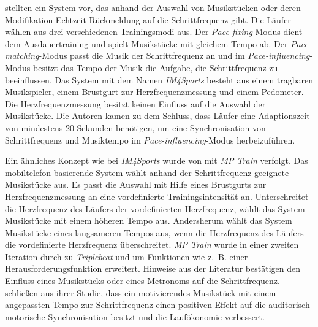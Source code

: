 \citet[][]{Wijnalda2005} stellten ein System vor, das anhand der Auswahl von Musikstücken oder deren Modifikation Echtzeit-Rückmeldung auf die Schrittfrequenz gibt. Die Läufer wählen aus drei verschiedenen Trainingsmodi aus. Der \emph{Pace-fixing}-Modus dient dem Ausdauertraining und spielt Musikstücke mit gleichem Tempo ab. Der \emph{Pace-matching}-Modus passt die Musik der Schrittfrequenz an und im \emph{Pace-influencing}-Modus besitzt das Tempo der Musik die Aufgabe, die Schrittfrequenz zu beeinflussen. Das System mit dem Namen \emph{IM4Sports} besteht aus einem tragbaren Musikspieler, einem Brustgurt zur Herzfrequenzmessung und einem Pedometer. Die Herzfrequenzmessung besitzt keinen Einfluss auf die Auswahl der Musikstücke. Die Autoren kamen zu dem Schluss, dass Läufer eine Adaptionszeit von mindestens 20 Sekunden benötigen, um eine Synchronisation von Schrittfrequenz und Musiktempo im \emph{Pace-influencing}-Modus herbeizuführen.

Ein ähnliches Konzept wie bei \emph{IM4Sports} wurde von \citet[][]{Oliver2006} mit \emph{MP Train} verfolgt. Das mobiltelefon-basierende System wählt anhand der Schrittfrequenz geeignete Musikstücke aus. Es passt die Auswahl mit Hilfe eines Brustgurts zur Herzfrequenzmessung an eine vordefinierte Trainingsintensität an. Unterschreitet die Herzfrequenz des Läufers der vordefinierten Herzfrequenz, wählt das System Musikstücke mit einem höheren Tempo aus. Andersherum wählt das System Musikstücke eines langsameren Tempos aus, wenn die Herzfrequenz des Läufers die vordefinierte Herzfrequenz überschreitet. \emph{MP Train} wurde in einer zweiten Iteration durch \citet[][]{DeOliveira2008} zu \emph{Triplebeat} und um Funktionen wie z.~B. einer Herausforderungsfunktion erweitert. Hinweise aus der Literatur \citep[z.~B.][]{Bood2013} bestätigen den Einfluss eines Musikstücks oder eines Metronoms auf die Schrittfrequenz. \citet[][]{Bood2013} schließen aus ihrer Studie, dass ein motivierendes Musikstück mit einem angepassten Tempo zur Schrittfrequenz einen positiven Effekt auf die auditorisch-motorische Synchronisation besitzt und die Laufökonomie verbessert.

